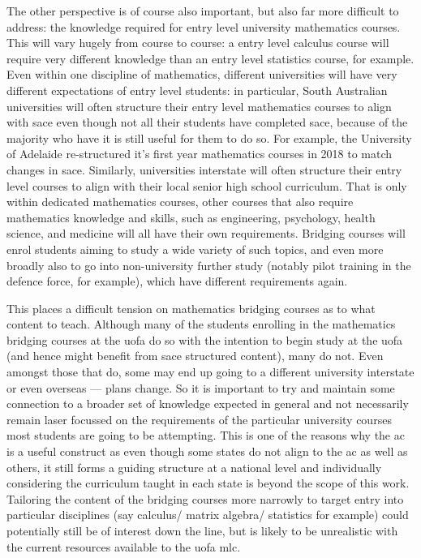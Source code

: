 \documentclass[twoside,12pt,a4paper]{report}
\begin{document}
The other perspective is of course also important, but also far more difficult to address: the knowledge required for entry level university mathematics courses. This will vary hugely from course to course: a entry level calculus course will require very different knowledge than an entry level statistics course, for example. Even within one discipline of mathematics, different universities will have very different expectations of entry level students: in particular, South Australian universities will often structure their entry level mathematics courses to align with \gls{sace} even though not all their students have completed \gls{sace}, because of the majority who have it is still useful for them to do so. For example, the University of Adelaide re-structured it's first year mathematics courses in 2018 to match changes in \gls{sace}. Similarly, universities interstate will often structure their entry level courses to align with their local senior high school curriculum. That is only within dedicated mathematics courses, other courses that also require mathematics knowledge and skills, such as engineering, psychology, health science, and medicine will all have their own requirements. Bridging courses will enrol students aiming to study a wide variety of such topics, and even more broadly also to go into non-university further study (notably pilot training in the defence force, for example), which have different requirements again.

This places a difficult tension on mathematics bridging courses as to what content to teach. Although many of the students enrolling in the mathematics bridging courses at the \gls{uofa} do so with the intention to begin study at the \gls{uofa} (and hence might benefit from \gls{sace} structured content), many do not. Even amongst those that do, some may end up going to a different university interstate or even overseas --- plans change. So it is important to try and maintain some connection to a broader set of knowledge expected in general and not necessarily remain laser focussed on the requirements of the particular university courses most students are going to be attempting. This is one of the reasons why the \gls{ac} is a useful construct as even though some states do not align to the \gls{ac} as well as others, it still forms a guiding structure at a national level and individually considering the curriculum taught in each state is beyond the scope of this work. Tailoring the content of the bridging courses more narrowly to target entry into particular disciplines (say calculus/ matrix algebra/ statistics for example) could potentially still be of interest down the line, but is likely to be unrealistic with the current resources available to the \gls{uofa} \gls{mlc}.
\end{document}
